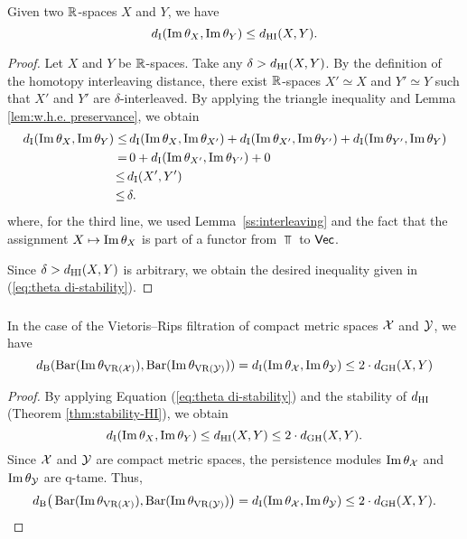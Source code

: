 \subsubsection{}\label{thm:theta stability}

\theorem Given two $\R$-spaces $X$ and $Y$, we have
\begin{equation}\label{eq:theta di-stability}
	\di(\thetamodule{X}, \thetamodule{Y}) \leq \dhi(X,Y).
\end{equation}

\begin{proof}
	Let $X$ and $Y$ be $\R$-spaces. 
	Take any $\delta > \dhi(X,Y)$.
	By the definition of the homotopy interleaving distance, there exist $\R$-spaces $X' \simeq X$ and $Y' \simeq Y$ such that $X'$ and $Y'$ are $\delta$-interleaved.
	By applying the triangle inequality and Lemma \ref{lem:w.h.e. preservance}, we obtain
	\begin{align*}
		\di(\thetamodule{X}, \thetamodule{Y}) \leq& \,
		\di(\thetamodule{X}, \thetamodule{X'}) + \di(\thetamodule{X'}, \thetamodule{Y'}) + \di(\thetamodule{Y'}, \thetamodule{Y}) \\ =& \, 
		0 + \di(\thetamodule{X'}, \thetamodule{Y'}) + 0 \\ \leq \,&
		\di(X',Y') \\ \leq \,&
		\delta.
	\end{align*}
	where, for the third line, we used Lemma~\ref{ss:interleaving} and the fact that the assignment $X \mapsto \thetamodule{X}$ is part of a functor from $\Top$ to $\Vec$.
	
	Since $\delta > \dhi(X,Y)$ is arbitrary, we obtain the desired inequality given in (\ref{eq:theta di-stability}).
\end{proof}

\subsubsection{}\label{cor:theta stability VR}
\corollary
In the case of the Vietoris--Rips filtration of compact metric spaces $\cX$ and $\cY$, we have
\[
\db(\thetabarc{\cX}, \thetabarc{\cY}) = \di(\thetamodule{\cX}, \thetamodule{\cY}) \leq 2 \cdot \dgh(X,Y)
\]

\begin{proof}
        By applying Equation (\ref{eq:theta di-stability}) and the stability of $\dhi$ (Theorem \ref{thm:stability-HI}), we obtain
        \[
        \di(\thetamodule{X}, \thetamodule{Y}) \leq
        \dhi(X,Y)\leq 2\cdot \dgh(X,Y).
        \]
        Since $\cX$ and $\cY$ are compact metric spaces, the persistence modules $\thetamodule{\cX}$ and $\thetamodule{\cY}$ are q-tame.
        Thus,
        \[
        \db\big(\thetabarc{\cX}, \thetabarc{\cY}\big) =
        \di(\thetamodule{\cX}, \thetamodule{\cY})\leq 2\cdot \dgh(X,Y).
        \]
\end{proof}

